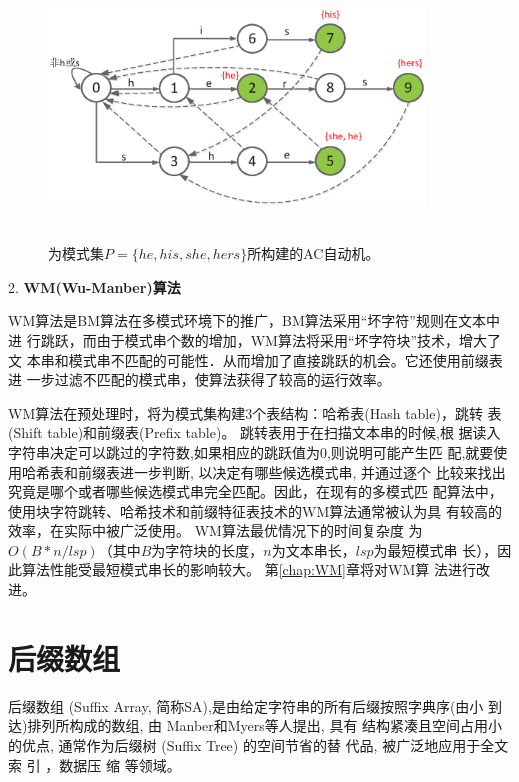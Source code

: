 \begin{figure}[H]
  \centering
  \includegraphics[height=7cm ,width=10cm]{figures/1_Introduction/AC.eps}
  \caption{为模式集$P=\{he, his, she, hers\}$所构建的AC自动机。}
  \label{fig:AC}
\end{figure}

2. \textbf{WM(Wu-Manber)算法}

WM算法是BM算法在多模式环境下的推广，BM算法采用“坏字符”规则在文本中进
行跳跃，而由于模式串个数的增加，WM算法将采用“坏字符块”技术，增大了文
本串和模式串不匹配的可能性．从而增加了直接跳跃的机会。它还使用前缀表进
一步过滤不匹配的模式串，使算法获得了较高的运行效率。

WM算法在预处理时，将为模式集构建3个表结构：哈希表(Hash table)，跳转
表(Shift table)和前缀表(Prefix table)。 跳转表用于在扫描文本串的时候,根
据读入字符串决定可以跳过的字符数,如果相应的跳跃值为0,则说明可能产生匹
配,就要使用哈希表和前缀表进一步判断, 以决定有哪些候选模式串, 并通过逐个
比较来找出究竟是哪个或者哪些候选模式串完全匹配。因此，在现有的多模式匹
配算法中，使用块字符跳转、哈希技术和前缀特征表技术的WM算法通常被认为具
有较高的效率，在实际中被广泛使用。 WM算法最优情况下的时间复杂度
为$O(B*n/lsp)$（其中$B$为字符块的长度，$n$为文本串长，$lsp$为最短模式串
长），因此算法性能受最短模式串长的影响较大。 第\ref{chap:WM}章将对WM算
法进行改进。

\section{后缀数组}

后缀数组 (Suffix Array, 简称SA),是由给定字符串的所有后缀按照字典序(由小
到达)排列所构成的数组, 由 Manber和Myers等人提出\cite{Manber1993}, 具有
结构紧凑且空间占用小的优点, 通常作为后缀树 (Suffix Tree) 的空间节省的替
代品, 被广泛地应用于全文索
引 \cite{Strate2015,Fischer2017,Arroyuelo2014}，数据压
缩\cite{Louza2015,Chien2015,Pradhan2016,Brisaboa2015} 等领域。

